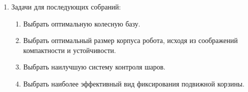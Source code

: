 \begin{enumerate}
\begin{enumerate}
    \end{enumerate}
    
	\item Задачи для последующих собраний:
	\begin{enumerate}
	  \item Выбрать оптимальную колесную базу.
	  
	  \item Выбрать оптимальный размер корпуса робота, исходя из соображений компактности и устойчивости.
	  
	  \item Выбрать наилучшую систему контроля шаров.
	  
	  \item Выбрать наиболее эффективный вид фиксирования подвижной корзины.
	  
    \end{enumerate}
\end{enumerate}
\fillpage


